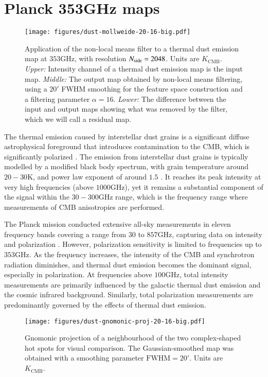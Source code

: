 \documentclass{aa}
\newcommand{\nside}{\ensuremath N_{\text{side}}}
\begin{document}
\section{Planck 353GHz maps}
\label{sec:dust}

\begin{figure*}
    \centering
    \texttt{[image: figures/dust-mollweide-20-16-big.pdf]}
    \caption{Application of the non-local means filter to a thermal dust emission map at $353$GHz, with resolution $\nside=2048$. Units are $K_{\text{CMB}}$. \emph{Upper:} Intensity channel of a thermal dust emission map is the input map. \emph{Middle:} The output map obtained by non-local means filtering, using a $20'$ FWHM smoothing for the feature space construction and a filtering parameter $\alpha=16$. \emph{Lower:} The difference between the input and output maps showing what was removed by the filter, which we will call a residual map.}
    \label{fig:dust}
\end{figure*}

The thermal emission caused by interstellar dust grains is a significant diffuse astrophysical foreground that introduces contamination to the CMB, which is significantly polarized \citep{2020A&A...641A..11P}. The emission from interstellar dust grains is typically modelled by a modified black body spectrum, with grain temperature around $20-30$K, and power law exponent of around $1.5$ \citep{2014A&A...571A..11P, 2015A&A...576A.107P}. It reaches its peak intensity at very high frequencies (above $1000$GHz), yet it remains a substantial component of the signal within the $30-300$GHz range, which is the frequency range where measurements of CMB anisotropies are performed. 

The Planck mission conducted extensive all-sky measurements in eleven frequency bands covering a range from $30$ to $857$GHz, capturing data on intensity and polarization \citep{2020A&A...641A...1P}. However, polarization sensitivity is limited to frequencies up to $353$GHz. As the frequency increases, the intensity of the CMB and synchrotron radiation diminishes, and thermal dust emission becomes the dominant signal, especially in polarization. At frequencies above $100$GHz, total intensity measurements are primarily influenced by the galactic thermal dust emission and the cosmic infrared background. Similarly, total polarization measurements are predominantly governed by the effects of thermal dust emission.

\begin{figure*}
    \centering
    \texttt{[image: figures/dust-gnomonic-proj-20-16-big.pdf]}
    \caption{Gnomonic projection of a neighbourhood of the two complex-shaped hot spots for visual comparison. The Gaussian-smoothed map was obtained with a smoothing parameter $\mathrm{FWHM}=20'$. Units are $K_{\text{CMB}}$.}
    \label{fig:dust:gnomonic}
\end{figure*}
\end{document}

